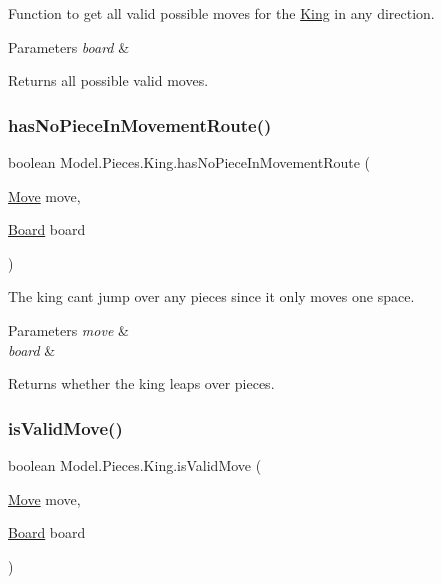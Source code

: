Function to get all valid possible moves for the \hyperlink{class_model_1_1_pieces_1_1_king}{King} in any direction. 
\begin{DoxyParams}{Parameters}
{\em board} & \\
\hline
\end{DoxyParams}
\begin{DoxyReturn}{Returns}
all possible valid moves. 
\end{DoxyReturn}
\hypertarget{class_model_1_1_pieces_1_1_king_aaf00b36ede859653e9c3ae8c72ea302c}{}\label{class_model_1_1_pieces_1_1_king_aaf00b36ede859653e9c3ae8c72ea302c} 
\subsubsection{\texorpdfstring{has\+No\+Piece\+In\+Movement\+Route()}{hasNoPieceInMovementRoute()}}
{\footnotesize\ttfamily boolean Model.\+Pieces.\+King.\+has\+No\+Piece\+In\+Movement\+Route (\begin{DoxyParamCaption}\item[{\hyperlink{class_model_1_1_move}{Move}}]{move,  }\item[{\hyperlink{class_model_1_1_board}{Board}}]{board }\end{DoxyParamCaption})}

The king can\textquotesingle{}t jump over any pieces since it only moves one space. 
\begin{DoxyParams}{Parameters}
{\em move} & \\
\hline
{\em board} & \\
\hline
\end{DoxyParams}
\begin{DoxyReturn}{Returns}
whether the king leaps over pieces. 
\end{DoxyReturn}
\hypertarget{class_model_1_1_pieces_1_1_king_afdaa2fec4da9bc1c217e9a3c88700cea}{}\label{class_model_1_1_pieces_1_1_king_afdaa2fec4da9bc1c217e9a3c88700cea} 
\subsubsection{\texorpdfstring{is\+Valid\+Move()}{isValidMove()}}
{\footnotesize\ttfamily boolean Model.\+Pieces.\+King.\+is\+Valid\+Move (\begin{DoxyParamCaption}\item[{\hyperlink{class_model_1_1_move}{Move}}]{move,  }\item[{\hyperlink{class_model_1_1_board}{Board}}]{board }\end{DoxyParamCaption})}

